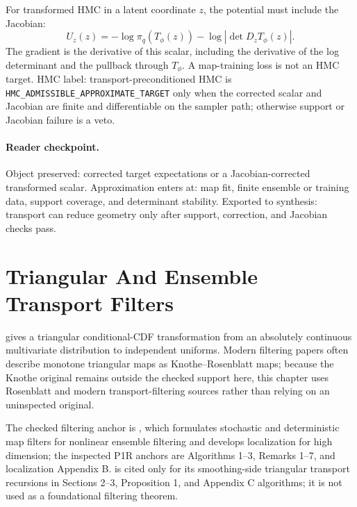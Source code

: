 For transformed HMC in a latent coordinate \(z\), the potential must include
the Jacobian:
\begin{equation}
  U_z(z)
  =
  -\log \pi_q(T_\phi(z))
  -\log|\det D_zT_\phi(z)|.
  \label{eq:bf-hd-transport-hmc-potential}
\end{equation}
The gradient is the derivative of this scalar, including the derivative of the
log determinant and the pullback through \(T_\phi\).  A map-training loss is
not an HMC target.  HMC label: transport-preconditioned HMC is
\texttt{HMC\_ADMISSIBLE\_APPROXIMATE\_TARGET} only when the corrected scalar and
Jacobian are finite and differentiable on the sampler path; otherwise support
or Jacobian failure is a veto.

\paragraph{Reader checkpoint.}
Object preserved: corrected target expectations or a Jacobian-corrected
transformed scalar.  Approximation enters at: map fit, finite ensemble or
training data, support coverage, and determinant stability.  Exported to
synthesis: transport can reduce geometry only after support, correction, and
Jacobian checks pass.

\section{Triangular And Ensemble Transport Filters}
\label{sec:bf-hd-ensemble-transport}

\citet{rosenblatt1952remarks} gives a triangular conditional-CDF
transformation from an absolutely continuous multivariate distribution to
independent uniforms.  Modern filtering papers often describe monotone
triangular maps as Knothe--Rosenblatt maps; because the Knothe original remains
outside the checked support here, this chapter uses Rosenblatt and modern
transport-filtering sources rather than relying on an uninspected original.

The checked filtering anchor is \citet{spantini2022coupling}, which formulates
stochastic and deterministic map filters for nonlinear ensemble filtering and
develops localization for high dimension; the inspected P1R anchors are
Algorithms 1--3, Remarks 1--7, and localization Appendix B.  \citet{ramgraber2023ensemble}
is cited only for its smoothing-side triangular transport recursions in
Sections 2--3, Proposition 1, and Appendix C algorithms; it is not used as a
foundational filtering theorem.


